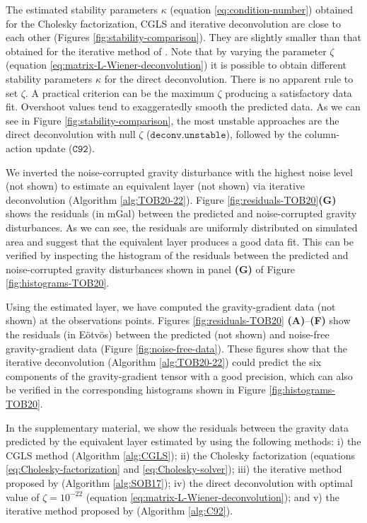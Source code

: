 The estimated stability parameters $\kappa$ (equation \ref{eq:condition-number}) obtained for the Cholesky factorization, CGLS and
iterative deconvolution are close to each other (Figures \ref{fig:stability-comparison}).
They are slightly smaller than that obtained for the iterative method of \citet{siqueira-etal2017}.
Note that by varying the parameter $\zeta$ (equation \ref{eq:matrix-L-Wiener-deconvolution}) it is possible to obtain different 
stability parameters $\kappa$ for the direct deconvolution. There is no apparent rule to set $\zeta$.
A practical criterion can be the maximum $\zeta$ producing a satisfactory data fit. Overshoot values tend to exaggeratedly smooth the 
predicted data.
As we can see in Figure \ref{fig:stability-comparison}, the most unstable approaches are the direct deconvolution with null $\zeta$
($\mathtt{deconv. unstable}$), followed by the column-action update ($\mathtt{C92}$).

We inverted the noise-corrupted gravity disturbance  with the highest noise level (not shown) 
to estimate an equivalent layer (not shown) via iterative deconvolution (Algorithm \ref{alg:TOB20-22}).
Figure \ref{fig:residuals-TOB20}\textbf{(G)} shows the residuals (in mGal) between the predicted and noise-corrupted 
gravity disturbances.
As we can see, the residuals are uniformly distributed on simulated area and suggest that the equivalent layer
produces a good data fit.
This can be verified by inspecting the histogram of the residuals between the predicted and noise-corrupted 
gravity disturbances shown in panel \textbf{(G)} of Figure \ref{fig:histograms-TOB20}.

Using the estimated layer, we have computed the gravity-gradient data (not shown) at the observations points.
Figures \ref{fig:residuals-TOB20} \textbf{(A)}--\textbf{(F)} show the residuals (in Eötvös)
between the predicted (not shown) and noise-free gravity-gradient data 
(Figure \ref{fig:noise-free-data}).
These figures show that the iterative deconvolution (Algorithm \ref{alg:TOB20-22}) could predict the six components of the
gravity-gradient tensor with a good precision, which can also be verified in the corresponding histograms shown in 
Figure \ref{fig:histograms-TOB20}.

In the supplementary material, we show the residuals between the gravity data predicted by the equivalent layer estimated by using the following methods:
i)  the CGLS method (Algorithm \ref{alg:CGLS});
ii) the  Cholesky factorization (equations \ref{eq:Cholesky-factorization} and \ref{eq:Cholesky-solver});
iii) the iterative method proposed by \citet{siqueira-etal2017} (Algorithm \ref{alg:SOB17});
iv) the direct deconvolution with  optimal value of $\zeta = 10^{-22}$ 
(equation \ref{eq:matrix-L-Wiener-deconvolution}); and
v) the iterative method  proposed by \cite{cordell1992} (Algorithm \ref{alg:C92}).



